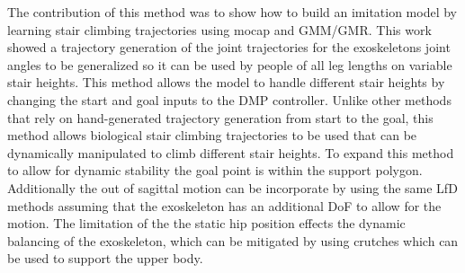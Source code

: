 The contribution of this method was to show how to build an imitation model by learning stair climbing trajectories using mocap and GMM/GMR. This work showed a trajectory generation of the joint trajectories for the exoskeletons joint angles to be generalized so it can be used by people of all leg lengths on variable stair heights. This method allows the model to handle different stair heights by changing the start and goal inputs to the DMP controller. Unlike other methods that rely on hand-generated trajectory generation from start to the goal, this method allows biological stair climbing trajectories to be used that can be dynamically manipulated to climb different stair heights. To expand this method to allow for dynamic stability the goal point is within the support polygon. Additionally the out of sagittal motion can be incorporate by using the same LfD methods assuming that the exoskeleton has an additional DoF to allow for the motion. The limitation of the the static hip position effects the dynamic balancing of the exoskeleton, which can be mitigated by using crutches which can be used to support the upper body. 


